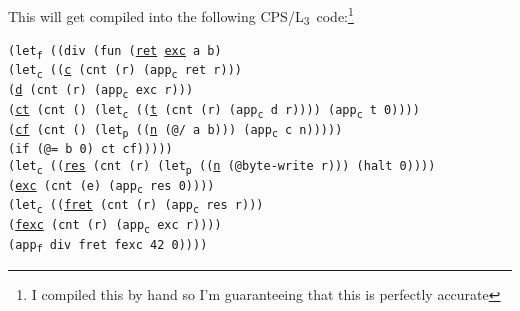 \documentclass[12pt,a4paper]{article}
\newcommand{\lang}{L\textsubscript{3}~}
\newcommand{\cps}[3]{\texttt{\textcolor{BurntOrange}{#1}#2\textcolor{BurntOrange}{#3}}}
\newcommand{\ts}[2]{#1\textsubscript{#2}}
\newcommand{\letp}{\ts{let}{p}}
\newcommand{\letc}{\ts{let}{c}}
\newcommand{\letf}{\ts{let}{f}}
\newcommand{\appc}{\ts{app}{c}}
\newcommand{\appf}{\ts{app}{f}}
\begin{document}
This will get compiled into the following CPS/\lang code:\footnote{I compiled this by hand so I'm guaranteeing that this is perfectly accurate}

\cps{(\letf~}{\cps{(}{(div \cps{(fun }{(\underline{ret} \underline{exc} a b)\\
\hspace*{8em}\cps{(\letc~}{\cps{(}{(\underline{c} \cps{(cnt }{(r) \cps{(\appc~}{ret r}{)}}{)})\\
\hspace*{11.4em}(\underline{d} \cps{(cnt }{(r) \cps{(\appc~}{exc r}{)}}{)})\\
\hspace*{11.4em}(\underline{ct} \cps{(cnt }{() \cps{(\letc~}{\cps{(}{(\underline{t} \cps{(cnt }{(r) \cps{(\appc~}{d r}{)}}{)})}{)} \cps{(\appc~}{t 0}{)}}{)}}{)})\\
\hspace*{11.4em}(\underline{cf} \cps{(cnt }{() \cps{(\letp~}{\cps{(}{(\underline{n} \cps{(@}{/ a b}{)})}{)} \cps{(\appc~}{c n}{)}}{)}}{)})}{)}\\
\hspace*{10em}\cps{(if (@}{= b 0}{) ct cf)}}{)}}{)})}{)}\\
\hspace*{3em}\cps{(\letc~}{\cps{(}{(\underline{res} \cps{(cnt }{(r) \cps{(\letp~}{\cps{(}{(\underline{n} \cps{(@}{byte-write r}{)})}{)} \cps{(halt }{0}{)}}{)}}{)})\\
\hspace*{6.4em}(\underline{exc} \cps{(cnt }{(e) \cps{(\appc~}{res 0}{)}}{)})}{)}\\
\hspace*{5em}\cps{(\letc~}{\cps{(}{(\underline{fret} \cps{(cnt }{(r) \cps{(\appc~}{res r}{)}}{)})\\
\hspace*{8.4em}(\underline{fexc} \cps{(cnt }{(r) \cps{(\appc~}{exc r}{)}}{)})}{)}\\
\hspace*{7em}\cps{(\appf~}{div fret fexc 42 0}{)}}{)}}{)}}{)}
\end{document}
